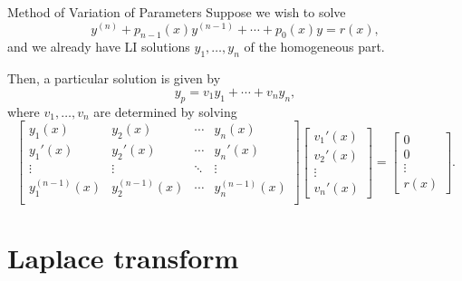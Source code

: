 \documentclass[dvipsnames]{beamer}
\theoremstyle{definition}
\begin{document}
\begin{frame}{Method of Variation of Parameters}
  Suppose we wish to solve
  \begin{equation*} 
    y^{(n)} + p_{n - 1}(x) y^{(n - 1)} + \cdots + p_{0}(x) y = r(x),
  \end{equation*}
  \pause and we already have LI solutions $y_{1}, \ldots, y_{n}$ of the homogeneous part. \pause 

  Then, a particular solution is given by
  \begin{equation*} 
    y_{p} = v_{1} y_{1} + \cdots + v_{n} y_{n},
  \end{equation*} \pause
  where $v_{1}, \ldots, v_{n}$ are determined by solving \pause
  \begin{equation*} 
    \begin{bmatrix}
      y_{1}(x) & y_{2}(x) & \cdots & y_{n}(x) \\
      y_{1}'(x) & y_{2}'(x) & \cdots & y_{n}'(x) \\
      \vdots & \vdots & \ddots & \vdots \\
      y_{1}^{(n - 1)}(x) & y_{2}^{(n - 1)}(x) & \cdots & y_{n}^{(n - 1)}(x) \\
    \end{bmatrix}
    \begin{bmatrix}
      v_{1}'(x) \\
      v_{2}'(x) \\
      \vdots \\
      v_{n}'(x)
    \end{bmatrix} 
    = 
    \begin{bmatrix}
      0 \\
      0 \\
      \vdots \\
      r(x)
    \end{bmatrix}.
  \end{equation*}
\end{frame}

\section{Laplace transform}
\end{document}
